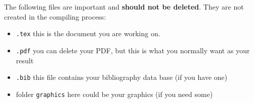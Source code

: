 \begin{frame}
\begin{minipage}{.40\textwidth}
\end{minipage}

\end{frame}


\begin{frame}

\begin{minipage}{.58\textwidth}
	The following files are important and \textbf{should not be deleted}. They are not created in the compiling process:
		
	\begin{itemize}
		\item \texttt{.tex} \ras this is the document you are working on.
		
		\item \texttt{.pdf} \ras you can delete your PDF, but this is what you normally want as your result
		
		\item \texttt{.bib} \ras this file contains your bibliography data base (if you have one)
		
		\item folder \texttt{graphics} \ras here could be your graphics (if you need some)
	\end{itemize}
	

\end{minipage}
\end{frame}
